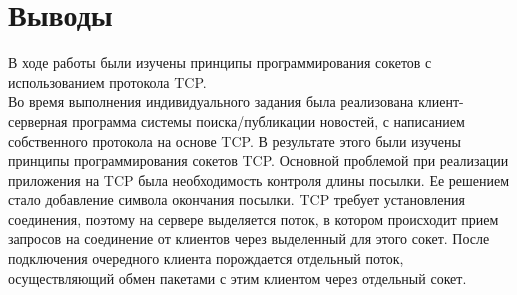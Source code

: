 \section{Выводы}

В ходе работы были изучены принципы программирования сокетов с использованием протокола TCP.\\
Во время выполнения индивидуального задания была реализована клиент-серверная программа системы поиска/публикации новостей, с написанием собственного протокола на основе TCP. 
В результате этого были изучены принципы программирования сокетов TCP. Основной проблемой при реализации приложения на TCP была необходимость контроля длины посылки. Ее решением стало добавление символа окончания посылки. TCP требует установления соединения, поэтому на сервере выделяется поток, в котором происходит прием запросов на соединение от клиентов через выделенный для этого сокет. После подключения очередного клиента порождается отдельный поток, осуществляющий обмен пакетами с этим клиентом через отдельный сокет. 



